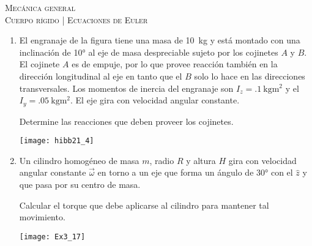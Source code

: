\documentclass[11pt,spanish,a4paper]{article}
\begin{document}
\begin{center}
  \textsc{\large Mecánica general}\\
  \textsc{\large Cuerpo rígido | Ecuaciones de Euler}
\end{center}


\begin{enumerate}


\item 
\begin{minipage}[t][3.5cm]{0.65\textwidth}
El engranaje de la figura tiene una masa de \SI{10}{\kilo\gram} y está montado con una inclinación de \ang{10;;} al eje de masa despreciable sujeto por los cojinetes \(A\) y \(B\).
El cojinete \(A\) es de empuje, por lo que provee reacción también en la dirección longitudinal al eje en tanto que el \(B\) solo lo hace en las direcciones transversales.
Los momentos de inercia del engranaje son \(I_z = \SI{.1}{\kilo\gram\metre\squared}\) y el \(I_y = \SI{.05}{\kilo\gram\metre\squared}\).
El eje gira con velocidad angular constante.
\begin{tasks} 
	\task Determine las reacciones que deben proveer los cojinetes.
\end{tasks}
\end{minipage}
\begin{minipage}[c][1cm][t]{0.3\textwidth}
	\texttt{[image: hibb21\_4]}
\end{minipage}




\item 
\begin{minipage}[t][3.5cm]{0.75\textwidth}
Un cilindro homogéneo de masa \(m\), radio \(R\) y altura \(H\) gira con velocidad angular constante \(\vec{\omega}\) en torno a un eje que forma un ángulo de \ang{30;;} con el \(\hat{z}\) y que pasa por su centro de masa. 
\begin{tasks} 
	\task Calcular el torque que debe aplicarse al cilindro para mantener tal movimiento.
\end{tasks}
\end{minipage}
\begin{minipage}[c][2cm][t]{0.2\textwidth}
	\texttt{[image: Ex3\_17]}
\end{minipage}





\end{enumerate}
\end{document}
